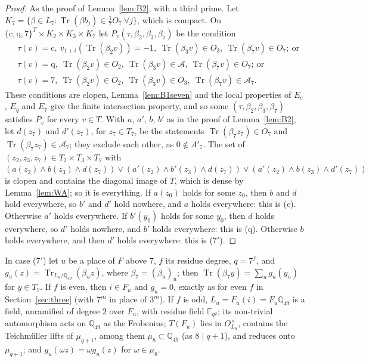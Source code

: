 \documentclass[11pt,a4paper]{amsart}
\theoremstyle{remark}
\newcommand{\Q}{\mathbb{Q}}
\newcommand{\F}{\mathbb{F}}
\newcommand{\Tr}{\operatorname{Tr}}
\newcommand{\cA}{\mathcal{A}}
\begin{document}
\begin{proof}
As the proof of Lemma~\ref{lem:B2}, with a third prime. Let $K_7=\{\beta\in L_7:\Tr(\beta b_j)\in\frac17O_7\ \forall
j\}$, which is compact. On $\{\mathrm c,\mathrm q,7\}^T\times K_2\times K_3\times K_7$ let $P_v(\tau,\beta_2,\beta_3,
\beta_7)$ be the condition
\begin{align*}
&\tau(v)=\mathrm c,\ v_{1+i}(\Tr(\beta_2v))=-1,\ \Tr(\beta_3v)\in O_3,\ \Tr(\beta_7v)\in O_7;\ \text{or}\\
&\tau(v)=\mathrm q,\ \Tr(\beta_2v)\in O_2,\ \Tr(\beta_3v)\in\cA,\ \Tr(\beta_7v)\in O_7;\ \text{or}\\
&\tau(v)=7,\ \Tr(\beta_2v)\in O_2,\ \Tr(\beta_3v)\in O_3,\ \Tr(\beta_7v)\in\cA_7.
\end{align*}
These conditions are clopen, Lemma~\ref{lem:B1seven} and the local properties of $E_c$, $E_q$ and $E_7$ give the finite
intersection property, and so some $(\tau,\beta_2,\beta_3,\beta_7)$ satisfies $P_v$ for every $v\in T$. With $a$,
$a'$, $b$, $b'$ as in the proof of Lemma~\ref{lem:B2}, let $d(z_7)$ and $d'(z_7)$, for $z_7\in T_7$, be the statements
$\Tr(\beta_7z_7)\in O_7$ and $\Tr(\beta_7z_7)\in\cA_7$; they exclude each other, as $0\notin A'_7$. The set of
$(z_2,z_3,z_7)\in T_2\times T_3\times T_7$ with $(a(z_2)\wedge b(z_3)\wedge d(z_7))\vee(a'(z_2)\wedge b'(z_3)\wedge
d(z_7))\vee(a'(z_2)\wedge b(z_3)\wedge d'(z_7))$ is clopen and contains the diagonal image of $T$, which is dense by
Lemma~\ref{lem:WA}; so it is everything. If $a(z_0)$ holds for some $z_0$, then $b$ and $d$ hold everywhere, so $b'$
and $d'$ hold nowhere, and $a$ holds everywhere: this is (c). Otherwise $a'$ holds everywhere. If $b'(y_0)$ holds for
some $y_0$, then $d$ holds everywhere, so $d'$ holds nowhere, and $b'$ holds everywhere: this is (q). Otherwise $b$
holds everywhere, and then $d'$ holds everywhere: this is (7$'$).
\end{proof}

In case (7$'$) let $u$ be a place of $F$ above $7$, $f$ its residue degree, $q=7^f$, and
$g_u(z)=\Tr_{L_u/\Q_{49}}(\beta_uz)$, where $\beta_7=(\beta_u)_u$; then $\Tr(\beta_7y)=\sum_ug_u(y_u)$ for $y\in T_7$. If
$f$ is even, then $i\in F_u$ and $g_u=0$, exactly as for even $f$ in Section~\ref{sec:three} (with $7^m$ in place of
$3^m$). If $f$ is odd, $L_u=F_u(i)=F_u\Q_{49}$ is a field, unramified of degree $2$ over $F_u$, with residue field
$\F_{q^2}$; its non-trivial automorphism acts on $\Q_{49}$ as the Frobenius; $T(F_u)$ lies in $O_{L_u}^\times$,
contains the Teichm\"uller lifts of $\mu_{q+1}$, among them $\mu_8\subset\Q_{49}$ (as $8\mid q+1$), and reduces onto
$\mu_{q+1}$; and $g_u(\omega z)=\omega g_u(z)$ for $\omega\in\mu_8$.
\end{document}
